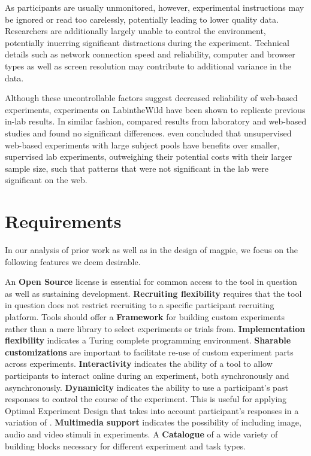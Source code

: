 \documentclass[a4paper,11pt]{scrreprt}
\begin{document}
As participants are usually unmonitored, however, experimental instructions may be ignored or read too carelessly, potentially leading to lower quality data. Researchers are additionally largely unable to control the environment, potentially inucrring significant distractions during the experiment. Technical details such as network connection speed and reliability, computer and browser types as well as screen resolution may contribute to additional variance in the data.

Although these uncontrollable factors suggest decreased reliability of web-based experiments, experiments on LabintheWild have been shown to replicate previous in-lab results. \citep{Gajos2015} In similar fashion, \citet{Schoeffler2013} compared results from laboratory and web-based studies and found no significant differences. \citet{RRMWSC2013} even concluded that unsupervised web-based experiments with large subject pools have benefits over smaller, supervised lab experiments, outweighing their potential costs with their larger sample size, such that patterns that were not significant in the lab were significant on the web.

\chapter{Requirements}
In our analysis of prior work as well as in the design of magpie, we focus on the following features we deem desirable.

An \textbf{Open Source} license is essential for common access to the tool in question as well as sustaining development. \textbf{Recruiting flexibility} requires that the tool in question does not restrict recruiting to a specific participant recruiting platform. Tools should offer a \textbf{Framework} for building custom experiments rather than a mere library to select experiments or trials from. \textbf{Implementation flexibility} indicates a Turing complete programming environment. \textbf{Sharable customizations} are important to facilitate re-use of custom experiment parts across experiments. \textbf{Interactivity} indicates the ability of a tool to allow participants to interact online during an experiment, both synchronously and asynchronously. \textbf{Dynamicity} indicates the ability to use a participant's past responses to control the course of the experiment. This is useful for applying Optimal Experiment Design that takes into account participant's responses in a variation of \citet{Ouyang2016}. \textbf{Multimedia support} indicates the possibility of including image, audio and video stimuli in experiments. A \textbf{Catalogue} of a wide variety of building blocks necessary for different experiment and task types.
\end{document}
